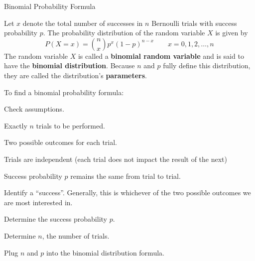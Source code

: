 \documentclass[
]{book}
\begin{document}
Binomial Probability Formula

Let \(x\) denote the total number of successes in \(n\) Bernoulli trials with success probability \(p\). The probability distribution of the random variable \(X\) is given by \[P(X=x) = \binom{n}{x}p^x(1-p)^{n-x} \quad\quad x = 0,1,2,\dots,n\] The random variable \(X\) is called a \textbf{binomial random variable} and is said to have the \textbf{binomial distribution}. Because \(n\) and \(p\) fully define this distribution, they are called the distribution's \textbf{parameters}.

To find a binomial probability formula:

Check assumptions.

Exactly \(n\) trials to be performed.

Two possible outcomes for each trial.

Trials are independent (each trial does not impact the result of the next)

Success probability \(p\) remains the same from trial to trial.

Identify a ``success''. Generally, this is whichever of the two possible outcomes we are most interested in.

Determine the success probability \(p\).

Determine \(n\), the number of trials.

Plug \(n\) and \(p\) into the binomial distribution formula.
\end{document}
